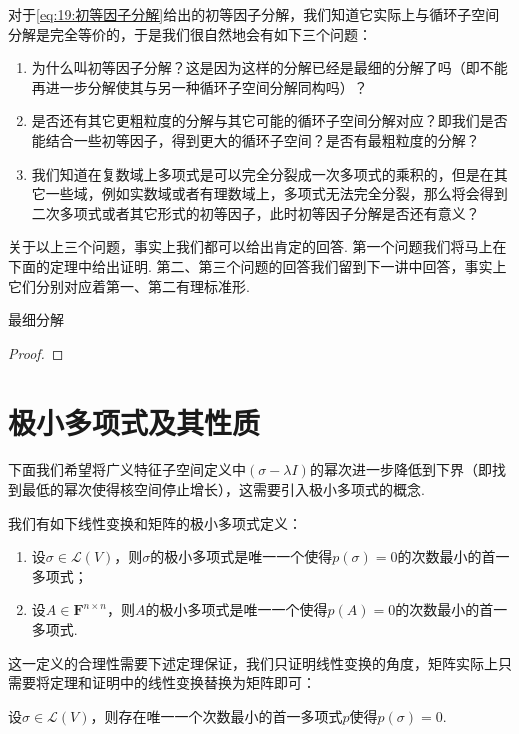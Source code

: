 对于\autoref{eq:19:初等因子分解}给出的初等因子分解，我们知道它实际上与循环子空间分解是完全等价的，于是我们很自然地会有如下三个问题：
\begin{enumerate}
    \item 为什么叫初等因子分解？这是因为这样的分解已经是最细的分解了吗（即不能再进一步分解使其与另一种循环子空间分解同构吗）？
    \item 是否还有其它更粗粒度的分解与其它可能的循环子空间分解对应？即我们是否能结合一些初等因子，得到更大的循环子空间？是否有最粗粒度的分解？
    \item 我们知道在复数域上多项式是可以完全分裂成一次多项式的乘积的，但是在其它一些域，例如实数域或者有理数域上，多项式无法完全分裂，那么将会得到二次多项式或者其它形式的初等因子，此时初等因子分解是否还有意义？
\end{enumerate}
关于以上三个问题，事实上我们都可以给出肯定的回答. 第一个问题我们将马上在下面的定理中给出证明. 第二、第三个问题的回答我们留到下一讲中回答，事实上它们分别对应着第一、第二有理标准形.
\begin{theorem}
    最细分解
\end{theorem}
\begin{proof}

\end{proof}

\section{极小多项式及其性质}
下面我们希望将广义特征子空间定义中$(\sigma-\lambda I)$的幂次进一步降低到下界（即找到最低的幂次使得核空间停止增长），这需要引入极小多项式的概念.
\begin{definition}
    我们有如下线性变换和矩阵的极小多项式定义：
    \begin{enumerate}
        \item 设$\sigma\in \mathcal{L}(V)$，则$\sigma$的极小多项式是唯一一个使得$p(\sigma)=0$的次数最小的首一多项式；

        \item 设$A\in\mathbf{F}^{n\times n}$，则$A$的极小多项式是唯一一个使得$p(A)=0$的次数最小的首一多项式.
    \end{enumerate}
\end{definition}
这一定义的合理性需要下述定理保证，我们只证明线性变换的角度，矩阵实际上只需要将定理和证明中的线性变换替换为矩阵即可：
\begin{theorem}\label{thm:21:极小多项式存在}
    设$\sigma\in \mathcal{L}(V)$，则存在唯一一个次数最小的首一多项式$p$使得$p(\sigma)=0$.
\end{theorem}

